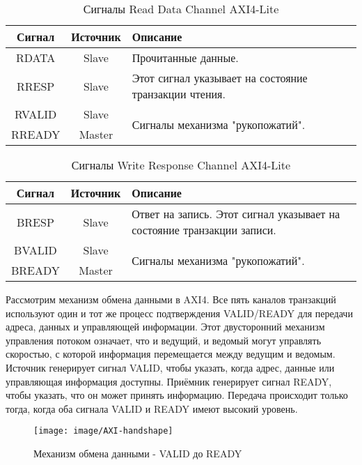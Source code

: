 \begin{table}[!ht]
	\centering
	\caption{Сигналы Read Data Channel AXI4-Lite}
	\label{RD}
		\begin{tabular}{  c c  p{} } 
			\toprule
			Сигнал & Источник & Описание \\ 
			\midrule
			RDATA & Slave & Прочитанные данные. \\ 
			RRESP & Slave  & Этот сигнал указывает на состояние транзакции чтения. \\ 
			RVALID & Slave  & \multirow{2}{*}{Сигналы механизма "рукопожатий".} \\ 
			RREADY & Master  & \\ 
			\bottomrule
		\end{tabular}
\end{table}

\begin{table}[!ht]
	\centering
	\caption{Сигналы Write Response Channel AXI4-Lite}
	\label{WRC}
		\begin{tabular}{  c c  p{} } 
			\toprule
			Сигнал & Источник & Описание \\
			\midrule
			BRESP & Slave  & Ответ на запись. Этот сигнал указывает на состояние транзакции записи. \\
			BVALID & Slave  & \multirow{2}{*}{Сигналы механизма "рукопожатий".} \\ 
			BREADY & Master  & \\ 
			\bottomrule
		\end{tabular}
\end{table}

\clearpage

Рассмотрим механизм обмена данными в AXI4. Все пять каналов транзакций используют один и тот же процесс подтверждения VALID/READY для передачи адреса, данных и управляющей информации. Этот двусторонний механизм управления потоком означает, что и ведущий, и ведомый могут управлять скоростью, с которой информация перемещается между ведущим и ведомым. Источник генерирует сигнал VALID, чтобы указать, когда адрес, данные или управляющая информация доступны. Приёмник генерирует сигнал READY, чтобы указать, что он может принять информацию. Передача происходит только тогда, когда оба сигнала VALID и READY имеют высокий уровень.

\begin{figure}[!ht]
	\centering
	\texttt{[image: image/AXI-handshape]}
	\caption{Механизм обмена данными - VALID до READY}
	\label{AXI-valid_before_ready}
\end{figure}

